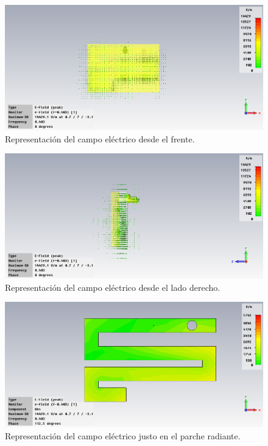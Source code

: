 \begin{figure}[!htb]
    \centering
    \includegraphics[scale=0.3]{./Simulaciones/original_antenna/original_antenna_E-Field_2}
    \caption{Representación del campo eléctrico desde el frente.}
    \label{fig:fig5.5}
\end{figure}

\begin{figure}[!htb]
    \centering
    \includegraphics[scale=0.3]{./Simulaciones/original_antenna/original_antenna_E-Field_3}
    \caption{Representación del campo eléctrico desde el lado derecho.}
    \label{fig:fig5.6}
\end{figure}

\begin{figure}[!htb]
    \centering
    \includegraphics[scale=0.3]{./Simulaciones/original_antenna/original_antenna_E-Field_4}
    \caption{Representación del campo eléctrico justo en el parche radiante.}
    \label{fig:fig5.7}
\end{figure}

